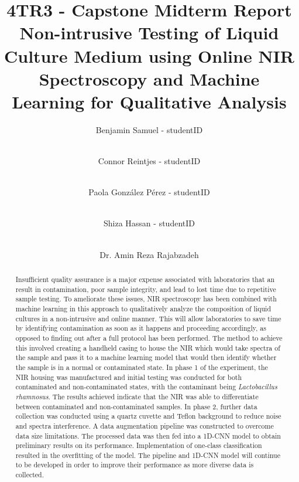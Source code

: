 \documentclass[final, 3p, 11pt]{elsarticle}
\begin{document}
\begin{frontmatter}


\title{4TR3 - Capstone Midterm Report\\}
\title{Non-intrusive Testing of Liquid Culture Medium using Online NIR Spectroscopy and Machine Learning for Qualitative Analysis}

\author[1]{Benjamin Samuel - studentID }
\author[1]{\\Connor Reintjes - studentID }
\author[1]{\\Paola Gonz\'alez P\'erez - studentID }
\author[1]{\\Shiza Hassan - studentID }
\author[1]{\\Dr. Amin Reza Rajabzadeh} %



\begin{abstract}
Insufficient quality assurance is a major expense associated with laboratories that an result in contamination, poor sample integrity, and lead to lost time due to repetitive sample testing. To ameliorate these issues, NIR spectroscopy has been combined with machine learning in this approach to qualitatively analyze the composition of liquid cultures in a non-intrusive and online manner. This will allow laboratories to save time by identifying contamination as soon as it happens and proceeding accordingly, as opposed to finding out after a full protocol has been performed. The method to achieve this involved creating a handheld casing to house the NIR which would take spectra of the sample and pass it to a machine learning model that would then identify whether the sample is in a normal or contaminated state. In phase 1 of the experiment, the NIR housing was manufactured and initial testing was conducted for both contaminated and non-contaminated states, with the contaminant being \textit{Lactobacillus rhamnosus}. The results achieved indicate that the NIR was able to differentiate between contaminated and non-contaminated samples. In phase 2, further data collection was conducted using a quartz cuvette and Teflon background to reduce noise and spectra interference. A data augmentation pipeline was constructed to overcome data size limitations. The processed data was then fed into a 1D-CNN model to obtain preliminary results on its performance. Implementation of one-class classification resulted in the overfitting of the model. The pipeline and 1D-CNN model will continue to be developed in order to improve their performance as more diverse data is collected.


\end{abstract}
\end{frontmatter}
\end{document}
